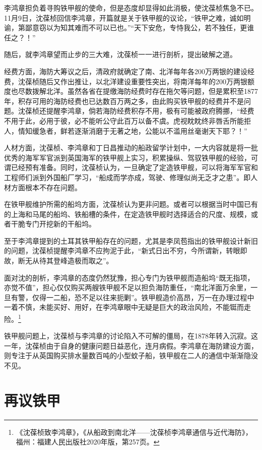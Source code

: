 \documentclass[12pt,UTF8]{ctexbook}
\begin{document}
李鸿章担负着寻购铁甲舰的使命，但是态度却显得如此消极，使沈葆桢焦急不已。11月9日，沈葆桢回信李鸿章，开篇就是关于铁甲舰的议论，“铁甲之难，诚如明谕，第鄙意窃以为知其难而不可以已也。”“天下安危，专恃我公，若不独任，更谁任之？！”

随后，就李鸿章望而止步的三大难，沈葆桢一一进行剖析，提出破解之道。

经费方面，海防大筹议之后，清政府就确定了南、北洋每年各200万两银的建设经费，沈葆桢随后又作出推让，以北洋建设重要性突出，将南洋每年的200万两银额度也尽数拨解北洋。虽然各省在提缴海防经费时存在拖欠等问题，但是累积至1877年，积存可用的海防经费也已达数百万两之多，由此购买铁甲舰的经费并不是问题。沈葆桢还提醒李鸿章，倘若海防经费积存不用，极有可能被政府腾挪，“经费不用于此，必用于彼，必不能听公守此百万以备不虞。虎视眈眈终非唇舌所能拒人，情知缓急者，鲜若逐渐消磨于无著之地，公能以不滥用丝毫谢天下耶？！”

人材方面，沈葆桢、李鸿章和丁日昌推动的船政留学计划中，一大内容就是将一批优秀的海军军官派到英国海军的铁甲舰上实习，积累操纵、驾驭铁甲舰的经验，可谓已经预有准备。同时，沈葆桢认为，一旦确定了定造铁甲舰，可以将海军军官和工程师们派到外国船厂学习，“船成而学亦成，驾驶、修理似尚无乏才之患”。即人材方面根本不存在问题。

在铁甲舰维护所需的船坞方面，沈葆桢认为更非问题。或者可以根据当时中国已有的上海和马尾的船坞、铁船槽的条件，在定造铁甲舰时选择适合的尺度、规模，或者干脆专门开挖新的干船坞。

至于李鸿章提到的土耳其铁甲船存在的问题，尤其是李凤苞指出的铁甲舰设计新旧的问题，沈葆桢提醒李鸿章不应拘泥于此，“新式日出不穷，今所谓新，转眼即故，断无从待其登峰造极而取之”。

面对沈的剖析，李鸿章的态度仍然犹豫，担心专门为铁甲舰而造船坞“既无指项，亦觉不值”，担心仅仅购买两艘铁甲舰不足以担负海防重任，“南北洋面万余里，一旦有警，仅得一二船，恐不足以往来扼剿”。铁甲舰造价高昂，万一在办理过程中一着不慎，未能买好、用好，在李鸿章眼中无疑是巨大的政治风险，不能铤而走险。\footnote{《沈葆桢致李鸿章》，《从船政到南北洋——沈葆桢李鸿章通信与近代海防》，福州：福建人民出版社2020年版，第257页。}

铁甲舰问题上，沈葆桢与李鸿章的讨论陷入不可解的僵局，在1878年转入沉寂。这一年，沈葆桢由于自身的健康问题日益恶化，连月病假。李鸿章在海防建设方面，则专注于从英国购买排水量数百吨的小型蚊子船，铁甲舰在二人的通信中渐渐隐没不见。

\section{再议铁甲}
\end{document}
